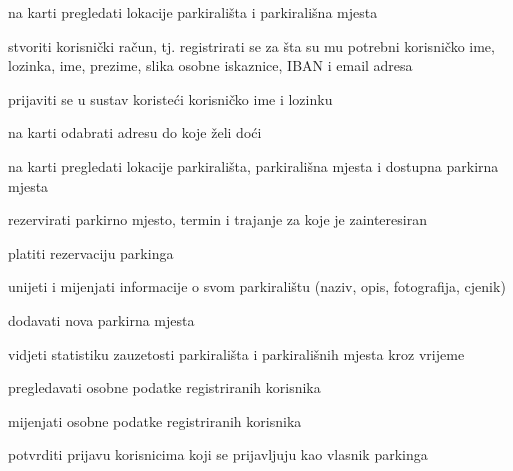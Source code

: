 			
			\begin{packed_enum}
				\item  {}
				
				\begin{packed_enum}
					\item na karti pregledati lokacije parkirališta i parkirališna mjesta
					\item stvoriti korisnički račun, tj. registrirati se za šta su mu potrebni korisničko ime, lozinka,  ime, prezime, slika osobne iskaznice, IBAN i email adresa 
				\end{packed_enum}
			
				\item  {}
				
				\begin{packed_enum}
					\item prijaviti se u sustav koristeći korisničko ime i lozinku
					\item na karti odabrati adresu do koje želi doći
					\item na karti pregledati lokacije parkirališta, parkirališna mjesta i dostupna parkirna mjesta
					\item rezervirati parkirno mjesto, termin i trajanje za koje je zainteresiran
					\item platiti rezervaciju parkinga 
				\end{packed_enum}
				
				\item  {}
				
				\begin{packed_enum}
					\item unijeti i mijenjati informacije o svom parkiralištu (naziv, opis, fotografija, cjenik)
					\item dodavati nova parkirna mjesta
					\item vidjeti statistiku zauzetosti parkirališta i parkirališnih mjesta kroz vrijeme
			 	\end{packed_enum}
			 	
				\item  {}
				
				\begin{packed_enum}
					\item pregledavati osobne podatke registriranih korisnika
					\item mijenjati osobne podatke registriranih korisnika
					\item potvrditi prijavu korisnicima koji se prijavljuju kao vlasnik parkinga
					
				\end{packed_enum}
			\end{packed_enum}
			\eject 
			
